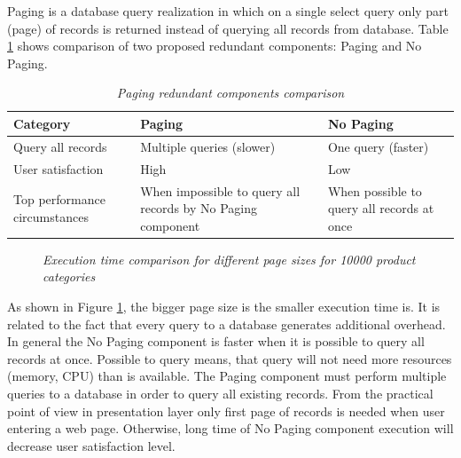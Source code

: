 \documentclass[12pt,a4paper]{article}
\begin{document}
Paging is a database query realization in which on a single select query only part (page) of records is returned instead of querying all records from database. Table \ref{pagingcomponents} shows comparison of two proposed redundant components: Paging and No Paging.  
\begin{table}[!htb]
\begin{center}
\begin{tabularx}{\textwidth}{p{3.5cm}|X|X}
  \textbf{Category} &\textbf{Paging} & \textbf{No Paging} \\
\hline
Query all records & Multiple queries (slower) & One query (faster) \\
User satisfaction & High & Low\\
Top performance circumstances & When impossible to query all records by No Paging component & When possible to query all records at once\\
\end{tabularx}
\end{center}
\caption{\textit{Paging redundant components comparison}}\label{pagingcomponents}
\end{table}

\begin{figure}[!htb]
\centering
{}

\caption{\textit{Execution time comparison for different page sizes for 10000 product categories}} \label{fig:pagesizetime}

\end{figure}

As shown in Figure \ref{fig:pagesizetime}, the bigger page size is the smaller execution time is. It is related to the fact that every query to a database generates additional overhead. 
In general the No Paging component is faster when it is possible to query all records at once. Possible to query means, that query will not need more resources (memory, CPU) than is available. 
The Paging component must perform multiple queries to a database in order to query all existing records. From the practical point of view in presentation layer only first page of records is needed when user entering a web page. Otherwise, long time of No Paging component execution will decrease user satisfaction level.  
\end{document}
